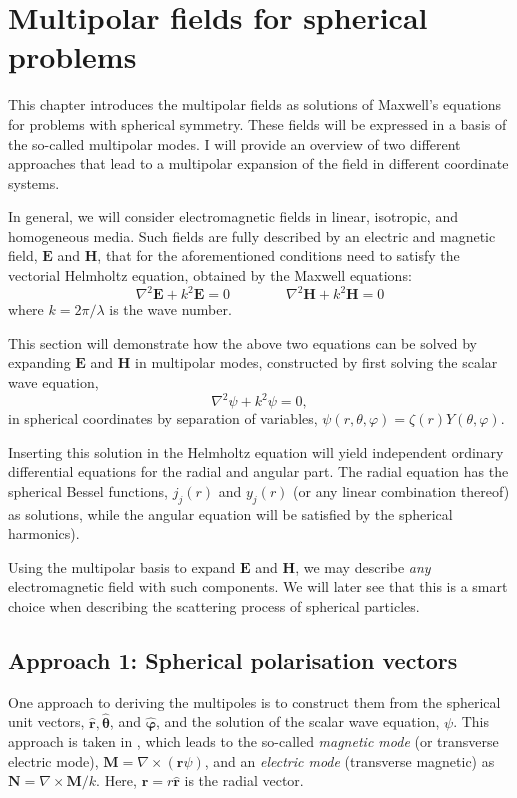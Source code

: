 \section{Multipolar fields for spherical problems}\label{sec:2}

This chapter introduces the multipolar fields as solutions of Maxwell's equations for problems with spherical symmetry. These fields will be expressed in a basis of the so-called multipolar modes. I will provide an overview of two different approaches that lead to a multipolar expansion of the field in different coordinate systems.

In general, we will consider electromagnetic fields in linear, isotropic, and homogeneous media. Such fields are fully described by an electric and magnetic field, \( \mathbf{E} \) and \( \mathbf{H} \), that for the aforementioned conditions need to satisfy the vectorial Helmholtz equation, obtained by the Maxwell equations:
\begin{equation}
    \label{eq:helmholtz}
    \nabla^2\mathbf{E} + k^2\mathbf{E} = 0 \qquad \qquad \nabla^2\mathbf{H} + k^2\mathbf{H} = 0
\end{equation}
where \( k = 2\pi / \lambda \) is the wave number.

This section will demonstrate how the above two equations can be solved by expanding \( \mathbf{E} \) and \( \mathbf{H} \) in multipolar modes, constructed by first solving the scalar wave equation,
\begin{equation}\label{eq:helmholtz_scalar}
    \nabla^2 \psi + k^2 \psi = 0,
\end{equation}
in spherical coordinates by separation of variables, \( \psi(r, \theta, \varphi) = \zeta(r) Y(\theta, \varphi) \).

Inserting this solution in the Helmholtz equation will yield independent ordinary differential equations for the radial and angular part. The radial equation has the spherical Bessel functions, \( j_j(r) \) and \( y_j(r) \) (or any linear combination thereof) as solutions, while the angular equation will be satisfied by the spherical harmonics).

Using the multipolar basis to expand \( \mathbf{E} \) and \( \mathbf{H} \), we may describe \textit{any} electromagnetic field with such components. We will later see that this is a smart choice when describing the scattering process of spherical particles.

\subsection{Approach 1: Spherical polarisation vectors}\label{sec:2_bohren}
One approach to deriving the multipoles is to construct them from the spherical unit vectors, \( \mathbf{\hat{r}}, \boldsymbol{\hat{\theta}} \), and \( \boldsymbol{\hat{\varphi}} \), and the solution of the scalar wave equation, \( \psi \). This approach is taken in \cite{bohren}, which leads to the so-called \textit{magnetic mode} (or transverse electric mode), \( \mathbf{M} = \nabla \times (\mathbf{r} \psi) \), and an \textit{electric mode} (transverse magnetic) as \( \mathbf{N} = \nabla \times \mathbf{M} / k \). Here, \( \mathbf{r} = r \hat{\mathbf{r}} \) is the radial vector.

